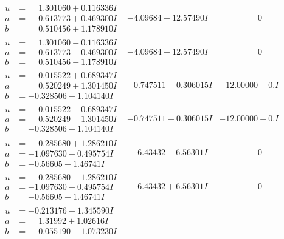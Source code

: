 \documentclass[1p]{elsarticle_modified}
\theoremstyle{definition}
\begin{document}
$$\begin{array}{c|c|c}
\begin{aligned}
u &= \phantom{-}1.301060 + 0.116336 I \\
a &= \phantom{-}0.613773 + 0.469300 I \\
b &= \phantom{-}0.510456 + 1.178910 I\end{aligned}
 & -4.09684 - 12.57490 I & \phantom{-0.000000 } 0 \\ \hline\begin{aligned}
u &= \phantom{-}1.301060 - 0.116336 I \\
a &= \phantom{-}0.613773 - 0.469300 I \\
b &= \phantom{-}0.510456 - 1.178910 I\end{aligned}
 & -4.09684 + 12.57490 I & \phantom{-0.000000 } 0 \\ \hline\begin{aligned}
u &= \phantom{-}0.015522 + 0.689347 I \\
a &= \phantom{-}0.520249 + 1.301450 I \\
b &= -0.328506 - 1.104140 I\end{aligned}
 & -0.747511 + 0.306015 I & -12.00000 + 0. I\phantom{ +0.000000I} \\ \hline\begin{aligned}
u &= \phantom{-}0.015522 - 0.689347 I \\
a &= \phantom{-}0.520249 - 1.301450 I \\
b &= -0.328506 + 1.104140 I\end{aligned}
 & -0.747511 - 0.306015 I & -12.00000 + 0. I\phantom{ +0.000000I} \\ \hline\begin{aligned}
u &= \phantom{-}0.285680 + 1.286210 I \\
a &= -1.097630 + 0.495754 I \\
b &= -0.56605 - 1.46741 I\end{aligned}
 & \phantom{-}6.43432 - 6.56301 I & \phantom{-0.000000 } 0 \\ \hline\begin{aligned}
u &= \phantom{-}0.285680 - 1.286210 I \\
a &= -1.097630 - 0.495754 I \\
b &= -0.56605 + 1.46741 I\end{aligned}
 & \phantom{-}6.43432 + 6.56301 I & \phantom{-0.000000 } 0 \\ \hline\begin{aligned}
u &= -0.213176 + 1.345590 I \\
a &= \phantom{-}1.31992 + 1.02616 I \\
b &= \phantom{-}0.055190 - 1.073230 I\end{aligned}

\end{array}$$
\end{document}
